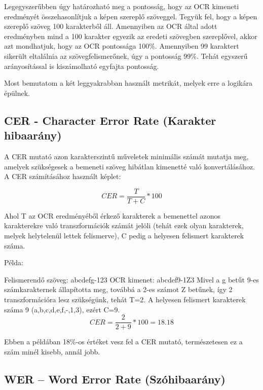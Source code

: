 \documentclass[12pt]{report}
\begin{document}
\newline
Legegyszerűbben úgy határozható meg a pontosság, hogy az OCR kimeneti eredményét összehasonlítjuk a képen szereplő szöveggel. Tegyük fel, hogy a képen szereplő szöveg 100 karakterből áll. Amennyiben az OCR által adott eredményben mind a 100 karakter egyezik az eredeti szövegben szereplővel, akkor azt mondhatjuk, hogy az OCR pontossága 100\%. Amennyiben 99 karaktert sikerült eltalálnia az szövegfelismerőnek, úgy a pontosság 99\%. Tehát egyszerű arányosítással is kiszámolható egyfajta pontosság.

\newline
Most bemutatom a két leggyakrabban használt metrikát, melyek erre a logikára épülnek.

\pagebreak
\subsection{CER - Character Error Rate (Karakter hibaarány)}

A CER mutató azon karakterszintű műveletek minimális számát mutatja meg, amelyek szükségesek a bemeneti szöveg hibátlan kimenetté való konvertálásához.
A CER számításához használt képlet:
\begin{tcolorbox}
    \[CER = \frac{T}{T+C} * 100\]
\end{tcolorbox}
Ahol T az OCR eredményéből érkező karakterek a bemenettel azonos karakterekre való transzformációk számát jelöli (tehát ezek olyan karakterek, melyek helytelenül lettek felismerve), C pedig a helyesen felismert karakterek száma.

\newline
Példa:
\begin{tcolorbox}
    Felismerendő szöveg: abcdefg-123
    \newline
    OCR kimenet: abcdef9-1Z3
    \newline
    Mivel a g betűt 9-es számkarakternek állapította meg, továbbá a 2-es számot Z betűnek, így 2 transzformációra lesz szükségünk, tehát T=2.
    \newline
    A helyesen felismert karakterek száma 9 (a,b,c,d,e,f,-,1,3), ezért C=9.
    \[CER = \frac{2}{2+9} * 100 = 18.18\]
\end{tcolorbox}
Ebben a példában 18\%-os értéket vesz fel a CER mutató, természetesen ez a szám minél kisebb, annál jobb.

\subsection{WER – Word Error Rate (Szóhibaarány)}
\end{document}
